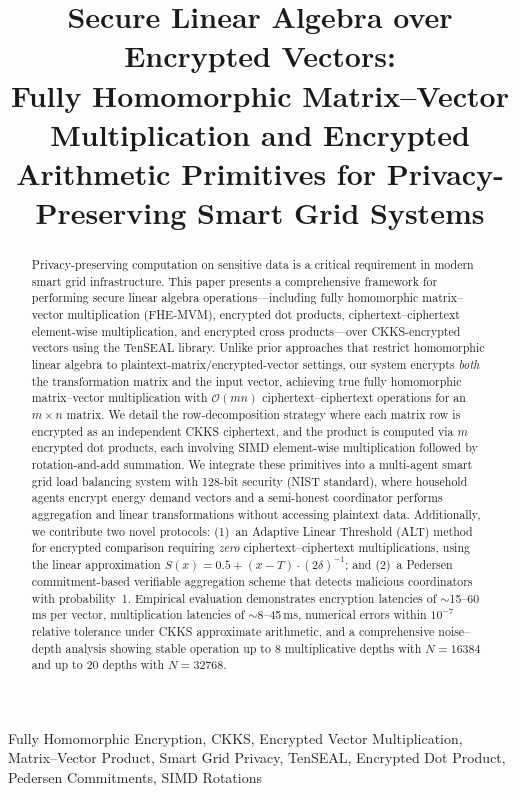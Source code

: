 \documentclass[conference,12pt]{IEEEtran}
\title{Secure Linear Algebra over Encrypted Vectors:\\Fully Homomorphic Matrix--Vector Multiplication and Encrypted Arithmetic Primitives for Privacy-Preserving Smart Grid Systems}
\author{
\IEEEauthorblockN{Divyam Sharma}
\IEEEauthorblockA{Indian Institute of Technology Dharwad\\
Dharwad, Karnataka, India\\
Email: divyam@iitdh.ac.in}
}
\begin{document}
\maketitle

\begin{abstract}
Privacy-preserving computation on sensitive data is a critical requirement in modern smart grid infrastructure. This paper presents a comprehensive framework for performing secure linear algebra operations---including fully homomorphic matrix--vector multiplication (FHE-MVM), encrypted dot products, ciphertext--ciphertext element-wise multiplication, and encrypted cross products---over CKKS-encrypted vectors using the TenSEAL library. Unlike prior approaches that restrict homomorphic linear algebra to plaintext-matrix/encrypted-vector settings, our system encrypts \emph{both} the transformation matrix and the input vector, achieving true fully homomorphic matrix--vector multiplication with $\mathcal{O}(mn)$ ciphertext--ciphertext operations for an $m \times n$ matrix. We detail the row-decomposition strategy where each matrix row is encrypted as an independent CKKS ciphertext, and the product is computed via $m$ encrypted dot products, each involving SIMD element-wise multiplication followed by rotation-and-add summation. We integrate these primitives into a multi-agent smart grid load balancing system with 128-bit security (NIST standard), where household agents encrypt energy demand vectors and a semi-honest coordinator performs aggregation and linear transformations without accessing plaintext data. Additionally, we contribute two novel protocols: (1)~an Adaptive Linear Threshold (ALT) method for encrypted comparison requiring \emph{zero} ciphertext--ciphertext multiplications, using the linear approximation $S(x) = 0.5 + (x-T) \cdot (2\delta)^{-1}$; and (2)~a Pedersen commitment-based verifiable aggregation scheme that detects malicious coordinators with probability~1. Empirical evaluation demonstrates encryption latencies of $\sim$15--60\,ms per vector, multiplication latencies of $\sim$8--45\,ms, numerical errors within $10^{-7}$ relative tolerance under CKKS approximate arithmetic, and a comprehensive noise--depth analysis showing stable operation up to 8 multiplicative depths with $N=16384$ and up to 20 depths with $N=32768$.
\end{abstract}

\begin{IEEEkeywords}
Fully Homomorphic Encryption, CKKS, Encrypted Vector Multiplication, Matrix--Vector Product, Smart Grid Privacy, TenSEAL, Encrypted Dot Product, Pedersen Commitments, SIMD Rotations
\end{IEEEkeywords}
\end{document}
